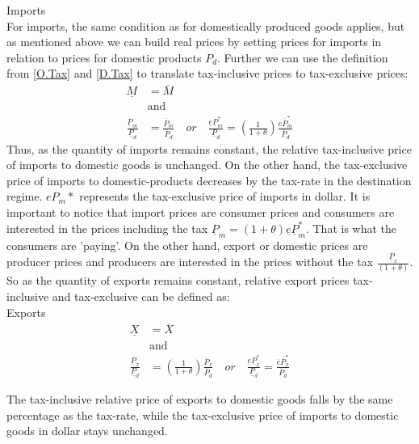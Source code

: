 \noindent Imports \\
For imports, the same condition as for domestically produced goods applies, but as mentioned above we can build real prices by setting prices for imports in relation to prices for domestic products $P_d$. Further we can use the definition from \eqref{O.Tax} and \eqref{D.Tax} to translate tax-inclusive prices to tax-exclusive prices: 
\begin{equation}\label{P.M}
\begin{aligned}
\underline M &= \overline M \\
&\text{and}\\
\frac{\underline P_m}{\underline P_d} &= \frac{\overline P_m}{\overline P_d} \quad or \quad \frac{\underline e \underline P_m^*}{\underline P_d} =  \left( \frac{1}{1+\theta} \right) \frac{\overline e \overline P^*_m}{\overline P_d}
\end{aligned}
\end{equation}
Thus, as the quantity of imports remains constant, the relative tax-inclusive price of imports to domestic goods is unchanged. On the other hand, the tax-exclusive price of imports to domestic-products decreases by the tax-rate in the destination regime. $e P_m*$ represents the tax-exclusive price of imports in dollar. 
It is important to notice that import prices are consumer prices and consumers are interested in the prices including the tax $\underline P_m = \left( 1+\theta \right) \underline e \underline P^*_m$. That is what the consumers are  'paying'. On the other hand, export or domestic prices are producer prices and producers are interested in the prices without the tax $\frac{\underline P_x}{ \left( 1+\theta \right) }$. So as the quantity of exports remains constant, relative export prices tax-inclusive and tax-exclusive can be defined as: \\
\noindent Exports
\begin{equation}\label{P.X}
\begin{aligned}
\underline X &= \overline X \\ &\text{and}\\ \frac{\underline P_x}{\underline P_d} &=  \left( \frac{1}{1+\theta} \right) \frac{\overline P_x}{\overline P_d} \quad or \quad \frac{\underline e \underline P_x^*}{\underline P_d} = \frac{\overline e \overline P^*_x}{\overline P_d}
\end{aligned}
\end{equation}

The tax-inclusive relative price of exports to domestic goods falls by the same percentage as the tax-rate, while the tax-exclusive price of imports to domestic goods in dollar stays unchanged. 

